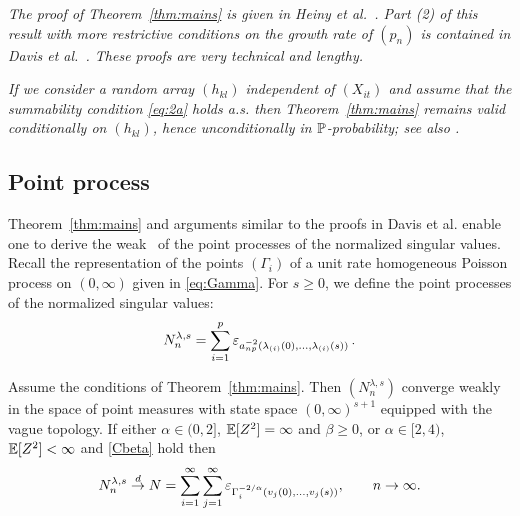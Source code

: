 \begin{remark}\em
The proof of Theorem~\ref{thm:mains} is given in Heiny et al.~\cite{heiny:mikosch:2016:noniid}. Part (2) of this  result
with more restrictive conditions on the growth rate of $(p_n)$ is contained in Davis et al.~\cite{davis:mikosch:pfaffel:2016}.
These proofs are very technical and lengthy.
\end{remark}
\begin{remark}\em
If we consider a random array $(h_{kl})$ independent of  $(X_{it})$ and
assume that the summability
condition \eqref{eq:2a} holds a.s.
then Theorem~\ref{thm:mains} remains valid conditionally on
$(h_{kl})$, hence  unconditionally in $\P$-probability; see also \cite{davis:mikosch:pfaffel:2016}.\end{remark}
\subsection{Point process \con }
Theorem~\ref{thm:mains}  and arguments similar to the proofs in Davis et al. \cite{davis:mikosch:pfaffel:2016}
enable one to derive the weak \con\ of
the point processes of the normalized singular values. Recall
the representation of the points $(\Gamma_i)$ of a unit rate homogeneous Poisson process on $(0,\infty)$
given in \eqref{eq:Gamma}. For $s\ge 0$, we define the point processes of the normalized singular values:
\begin{equation}\label{eq:ppdef}
N_n^{\lambda,s}=\sum_{i=1}^p \vep_{a_{np}^{-2}(\lambda_{(i)}(0),\ldots,\lambda_{(i)}(s))} \,.
\end{equation}

\begin{theorem}\label{cor:1}
Assume the conditions of Theorem~\ref{thm:mains}.
Then $(N_n^{\lambda,s})$ converge weakly in the space of point measures
with state space $(0,\infty)^{s+1}$ equipped with the vague topology.
If either $\alpha \in (0,2]$, $\E[Z^2]=\infty$ and $\beta \ge 0$,
or $\alpha \in [2,4)$, $\E[Z^2]<\infty$ and \ref{Cbeta} hold then
\begin{equation}\label{eq:Davispp}
N_n^{\lambda,s} \cid N= \sum_{i=1}^\infty
\sum_{j=1}^{\infty} \vep_{\Gamma_i^{-2/\alpha} (v_j(0),\ldots,v_j(s))}, \qquad \nto.
\end{equation}
\end{theorem}

